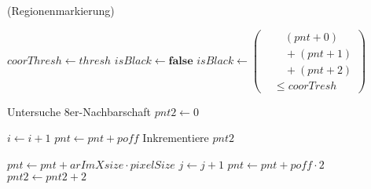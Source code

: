 \begin{algorithm}[!ht]\small
\caption{ (Regionenmarkierung)}
\label{alg:arlabeling-regionlabeling}
\begin{algorithmic}[1]
	\label{alg:arlabeling-regionlabeling-loop1-start}

		\label{alg:arlabeling-regionlabeling-loop2-start}

			\State $\mathit{coorThresh} \gets \mathit{thresh}$
			\label{alg:arlabeling-regionlabeling-threshold-start}
			\State $\mathit{isBlack} \gets \textbf{false}$
			\State $\mathit{isBlack} \gets \left(
			\begin{aligned}
				& \quad (\mathit{pnt} + 0) \\
				& \quad + (\mathit{pnt} + 1) \\
				& \quad + (\mathit{pnt} + 2) \\
				& \leq \mathit{coorTresh}
			\end{aligned}\right)$
			\label{alg:arlabeling-regionlabeling-calcblack}

			\label{alg:arlabeling-regionlabeling-isblack?}
				\State Untersuche 8er-Nachbarschaft
				\label{alg:arlabeling-regionlabeling-black}
			\Else
				\State $\mathit{pnt2} \gets 0$
				\label{alg:arlabeling-regionlabeling-notblack}
			\EndIf
			\label{alg:arlabeling-regionlabeling-threshold-end}

			\State $i \gets i + 1$
			\label{alg:arlabeling-regionlabeling-inc1-start}
			\State $\mathit{pnt} \gets \mathit{pnt} + \mathit{poff}$
			\State Inkrementiere $\mathit{pnt2}$
			\label{alg:arlabeling-regionlabeling-inc1-end}
		\EndFor
		\label{alg:arlabeling-regionlabeling-loop2-end}

		\State $\mathit{pnt} \gets \mathit{pnt} + \mathit{arImXsize} \cdot \mathit{pixelSize}$
		\label{alg:arlabeling-regionlabeling-inc2-start}
		\State $j \gets j + 1$
		\State $\mathit{pnt} \gets \mathit{pnt} + \mathit{poff} \cdot 2$
		\State $\mathit{pnt2} \gets \mathit{pnt2} + 2$
		\label{alg:arlabeling-regionlabeling-inc2-end}
	\EndFor
	\label{alg:arlabeling-regionlabeling-loop1-end}
\end{algorithmic}
\end{algorithm}